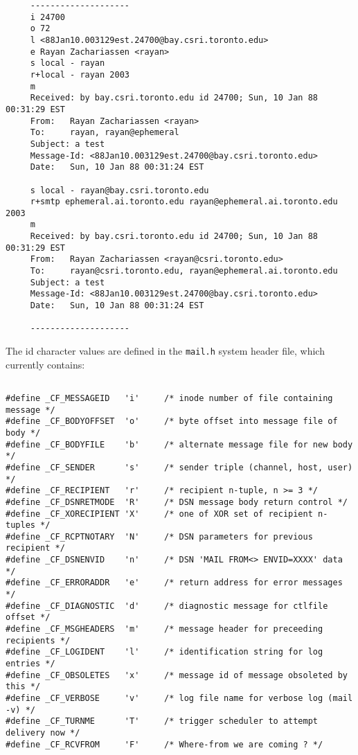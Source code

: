 \begin{verbatim}
     --------------------
     i 24700
     o 72
     l <88Jan10.003129est.24700@bay.csri.toronto.edu>
     e Rayan Zachariassen <rayan>
     s local - rayan
     r+local - rayan 2003
     m
     Received: by bay.csri.toronto.edu id 24700; Sun, 10 Jan 88 00:31:29 EST
     From:   Rayan Zachariassen <rayan>
     To:     rayan, rayan@ephemeral
     Subject: a test
     Message-Id: <88Jan10.003129est.24700@bay.csri.toronto.edu>
     Date:   Sun, 10 Jan 88 00:31:24 EST
     
     s local - rayan@bay.csri.toronto.edu
     r+smtp ephemeral.ai.toronto.edu rayan@ephemeral.ai.toronto.edu 2003
     m
     Received: by bay.csri.toronto.edu id 24700; Sun, 10 Jan 88 00:31:29 EST
     From:   Rayan Zachariassen <rayan@csri.toronto.edu>
     To:     rayan@csri.toronto.edu, rayan@ephemeral.ai.toronto.edu
     Subject: a test
     Message-Id: <88Jan10.003129est.24700@bay.csri.toronto.edu>
     Date:   Sun, 10 Jan 88 00:31:24 EST
     
     --------------------
\end{verbatim}


The id character values are defined in the {\tt mail.h} system header file,
which currently contains:

\begin{verbatim}
     
#define _CF_MESSAGEID   'i'     /* inode number of file containing message */
#define _CF_BODYOFFSET  'o'     /* byte offset into message file of body */
#define _CF_BODYFILE    'b'     /* alternate message file for new body */
#define _CF_SENDER      's'     /* sender triple (channel, host, user) */
#define _CF_RECIPIENT   'r'     /* recipient n-tuple, n >= 3 */
#define _CF_DSNRETMODE  'R'     /* DSN message body return control */
#define _CF_XORECIPIENT 'X'     /* one of XOR set of recipient n-tuples */
#define _CF_RCPTNOTARY  'N'     /* DSN parameters for previous recipient */
#define _CF_DSNENVID    'n'     /* DSN 'MAIL FROM<> ENVID=XXXX' data */
#define _CF_ERRORADDR   'e'     /* return address for error messages */
#define _CF_DIAGNOSTIC  'd'     /* diagnostic message for ctlfile offset */
#define _CF_MSGHEADERS  'm'     /* message header for preceeding recipients */
#define _CF_LOGIDENT    'l'     /* identification string for log entries */
#define _CF_OBSOLETES   'x'     /* message id of message obsoleted by this */
#define _CF_VERBOSE     'v'     /* log file name for verbose log (mail -v) */
#define _CF_TURNME      'T'     /* trigger scheduler to attempt delivery now */
#define _CF_RCVFROM     'F'     /* Where-from we are coming ? */               
\end{verbatim}


